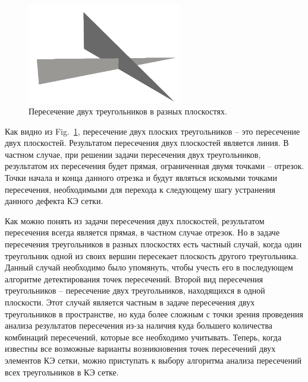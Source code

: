 \documentclass[
11pt,%
tightenlines,%
twoside,%
onecolumn,%
nofloats,%
nobibnotes,%
nofootinbib,%
superscriptaddress,%
noshowpacs,%
centertags]%
{revtex4}
\begin{document}
\begin{figure}[h]
\includegraphics[width=0.6\textwidth]{pics/pic_2.png}
\caption{Пересечение двух треугольников в разных плоскостях.}\label{fig:2}
\end{figure}

Как видно из Fig.~\ref{fig:2}, пересечение двух плоских треугольников – это пересечение двух плоскостей. Результатом пересечения двух плоскостей является линия. В частном случае, при решении задачи пересечения двух треугольников, результатом их пересечения будет прямая, ограниченная двумя точками – отрезок. Точки начала и конца данного отрезка и будут являться искомыми точками пересечения, необходимыми для перехода к следующему шагу устранения данного дефекта КЭ сетки.

Как можно понять из задачи пересечения двух плоскостей, результатом пересечения всегда является прямая, в частном случае отрезок. Но в задаче пересечения треугольников в разных плоскостях есть частный случай, когда один треугольник одной из своих вершин пересекает плоскость другого треугольника. Данный случай необходимо было упомянуть, чтобы учесть его в последующем алгоритме детектирования точек пересечений.
Второй вид пересечения треугольников – пересечение двух треугольников, находящихся в одной плоскости. Этот случай является частным в задаче пересечения двух треугольников в пространстве, но куда более сложным с точки зрения проведения анализа результатов пересечения из-за наличия куда большего количества комбинаций пересечений, которые все необходимо учитывать. 
Теперь, когда известны все возможные варианты возникновения точек пересечений двух элементов КЭ сетки, можно приступать к выбору алгоритма анализа пересечений всех треугольников в КЭ сетке.
\end{document}
